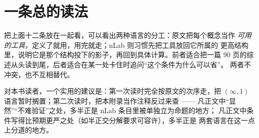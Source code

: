 \clearpage
\section{一条总的读法}

把上面十二条放在一起看，可以看出两种语言的分工：原文把每个概念当作
\emph{可用的工具}，定义了就用，用完就走；nLab 则习惯先把工具放回它所属的
更高结构里，说明它是那个结构投下的影子，再回到具体计算。前者适合把一篇
90 页的综述从头读到尾，后者适合在某一处卡住时追问“这个条件为什么可以省”。
两者不冲突，也不互相替代。

对本书读者，一个实用的建议是：第一次读时完全按原文的次序走，把
$(\infty,1)$ 语言暂时搁置；第二次读时，把本附录当作注释反过来查 ——
凡正文中“显然”“不难验证”之处，多半正是 nLab 条目里被单独立为命题的地方；
凡正文中条件写得比预期更严之处（如半正交分解要求可容许），多半正是
两套语言在这一点上分道的地方。
